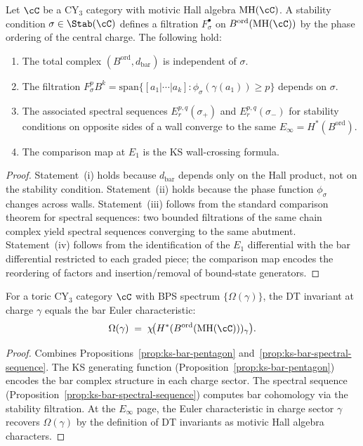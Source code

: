 \begin{proposition}
\label{prop:ks-bar-spectral-sequence}
Let $\cC$ be a CY$_3$ category with motivic Hall algebra $\mathrm{MH}(\cC)$. A stability condition $\sigma \in \Stab(\cC)$ defines a filtration $F^\bullet_\sigma$ on $B^{\mathrm{ord}}(\mathrm{MH}(\cC))$ by the phase ordering of the central charge. The following hold:
\begin{enumerate}[label=\textup{(\roman*)}]
\item The total complex $(B^{\mathrm{ord}}, d_{\mathrm{bar}})$ is independent of $\sigma$.
\item The filtration $F^p_\sigma B^k = \mathrm{span}\{[a_1 | \cdots | a_k] : \phi_\sigma(\gamma(a_1)) \geq p\}$ depends on $\sigma$.
\item The associated spectral sequences $E_r^{p,q}(\sigma_+)$ and $E_r^{p,q}(\sigma_-)$ for stability conditions on opposite sides of a wall converge to the same $E_\infty = H^\ast(B^{\mathrm{ord}})$.
\item The comparison map at $E_1$ is the KS wall-crossing formula.
\end{enumerate}
\begin{proof}
Statement~(i) holds because $d_{\mathrm{bar}}$ depends only on the Hall product, not on the stability condition. Statement~(ii) holds because the phase function $\phi_\sigma$ changes across walls. Statement~(iii) follows from the standard comparison theorem for spectral sequences: two bounded filtrations of the same chain complex yield spectral sequences converging to the same abutment. Statement~(iv) follows from the identification of the $E_1$ differential with the bar differential restricted to each graded piece; the comparison map encodes the reordering of factors and insertion/removal of bound-state generators.
\end{proof}
\end{proposition}

\begin{proposition}
\label{prop:bps-bar-euler-toric}
For a toric CY$_3$ category $\cC$ with BPS spectrum $\{\Omega(\gamma)\}$, the DT invariant at charge $\gamma$ equals the bar Euler characteristic:
\[
 \Omega(\gamma) \;=\; \chi\!\bigl(H^\ast(B^{\mathrm{ord}}(\mathrm{MH}(\cC)))_\gamma\bigr).
\]
\begin{proof}
Combines Propositions~\ref{prop:ks-bar-pentagon} and~\ref{prop:ks-bar-spectral-sequence}. The KS generating function (Proposition~\ref{prop:ks-bar-pentagon}) encodes the bar complex structure in each charge sector. The spectral sequence (Proposition~\ref{prop:ks-bar-spectral-sequence}) computes bar cohomology via the stability filtration. At the $E_\infty$ page, the Euler characteristic in charge sector $\gamma$ recovers $\Omega(\gamma)$ by the definition of DT invariants as motivic Hall algebra characters.
\end{proof}
\end{proposition}


